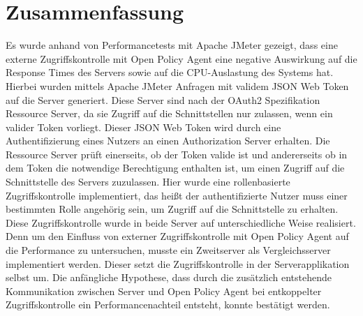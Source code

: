 \chapter{Zusammenfassung}
Es wurde anhand von Performancetests mit Apache JMeter gezeigt, dass eine externe Zugriffskontrolle mit Open Policy Agent eine negative Auswirkung auf die Response Times des Servers sowie auf die CPU-Auslastung des Systems hat. Hierbei wurden mittels Apache JMeter Anfragen mit validem JSON Web Token auf die Server generiert. Diese Server sind nach der OAuth2 Spezifikation Ressource Server, da sie Zugriff auf die Schnittstellen nur zulassen, wenn ein valider Token vorliegt. Dieser JSON Web Token wird durch eine Authentifizierung eines Nutzers an einen Authorization Server erhalten. Die Ressource Server prüft einerseits, ob der Token valide ist und andererseits ob in dem Token die notwendige Berechtigung enthalten ist, um einen Zugriff auf die Schnittstelle des Servers zuzulassen. Hier wurde eine rollenbasierte Zugriffskontrolle implementiert, das heißt der authentifizierte Nutzer muss einer bestimmten Rolle angehörig sein, um Zugriff auf die Schnittstelle zu erhalten. Diese Zugriffskontrolle wurde in beide Server auf unterschiedliche Weise realisiert. Denn um den Einfluss von externer Zugriffskontrolle mit Open Policy Agent auf die Performance zu untersuchen, musste ein Zweitserver als Vergleichsserver implementiert werden. Dieser setzt die Zugriffskontrolle in der Serverapplikation selbst um. Die anfängliche Hypothese, dass durch die zusätzlich entstehende Kommunikation zwischen Server und Open Policy Agent bei entkoppelter Zugriffskontrolle ein Performancenachteil entsteht, konnte bestätigt werden.\bigskip


